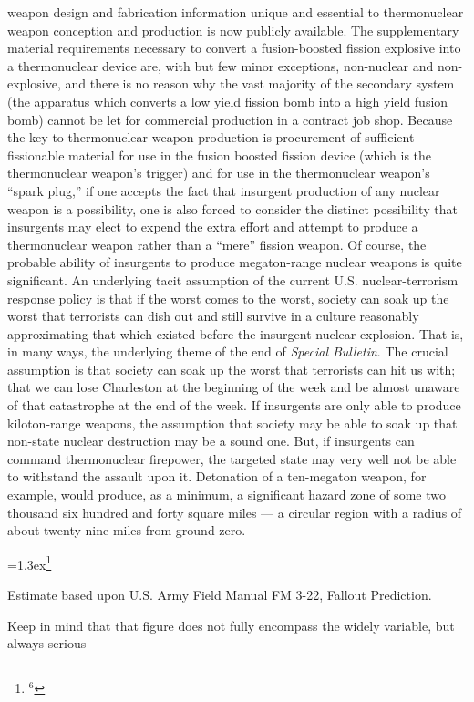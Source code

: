 weapon design
and fabrication information unique and essential to thermonuclear weapon 
conception and production is now publicly available. The supplementary
material requirements necessary to convert a fusion-boosted fission explosive
into a thermonuclear device are, with but few minor exceptions, non-nuclear and
non-explosive, and there is no reason why the vast majority of the secondary
system (the apparatus which converts a low yield fission bomb into a high yield
fusion bomb) cannot be let for commercial production in a contract job shop.
Because the key to thermonuclear weapon production is procurement of sufficient
fissionable material for use in the fusion boosted fission device (which is
the thermonuclear weapon's trigger) and for use in the thermonuclear weapon's
``spark plug,'' if one accepts the fact that insurgent production of any
nuclear weapon is a possibility, one is also forced to consider the distinct
possibility that insurgents may elect to expend the extra effort and attempt
to produce a thermonuclear weapon rather than a ``mere'' fission weapon.
\bigskip
Of course, the probable ability of insurgents to produce megaton-range nuclear
weapons is quite significant. An underlying tacit assumption of the current
U.S. nuclear-terrorism response policy is that if the worst comes to the worst,
society can soak up the worst that terrorists can dish out and still survive in
a culture reasonably approximating that which existed before the insurgent
nuclear explosion. That is, in many ways, the underlying theme of the end of
{\it Special Bulletin}. The crucial assumption is that society can soak up the
worst that terrorists can hit us with; that we can lose Charleston at the 
beginning of the week and be almost unaware of that catastrophe at the end of
the week.
\bigskip
If insurgents are only able to produce kiloton-range weapons, the 
assumption that society may be able to soak up that non-state nuclear 
destruction may be a sound one. But, if insurgents can command thermonuclear
firepower, the targeted state may very well not be able to withstand the
assault upon it. Detonation of a ten-megaton weapon, for example, would
produce, as a minimum, a significant hazard zone of some two thousand
six hundred and forty square miles --- a circular region with a radius of
about twenty-nine miles from ground 
zero.{\baselineskip=1.3ex\footnote{$^{6}$}{Estimate based upon
U.S. Army Field Manual FM 3-22, Fallout Prediction.\par}}
Keep in mind that
that figure does not fully encompass the widely variable, but always serious
